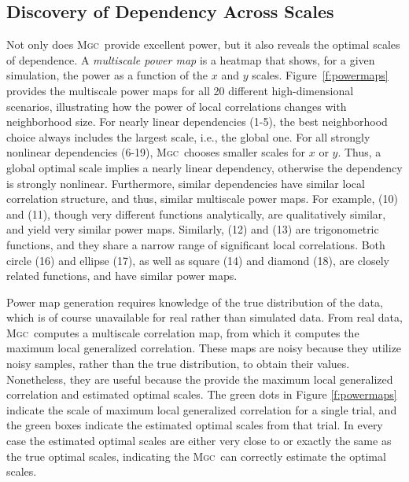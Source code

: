 \documentclass[11pt]{article}
\providecommand{\sct}[1]{{\normalfont\textsc{#1}}}
\newcommand{\Mgc}{\sct{Mgc}}
\begin{document}
\subsection*{Discovery of Dependency Across Scales}
\label{main3}

Not only does \Mgc~provide excellent power, but it also reveals the optimal scales of dependence. 
A \emph{multiscale power map} is a heatmap that shows, for a given simulation, the power as a function of the $x$ and $y$ scales.  
Figure~\ref{f:powermaps} provides the multiscale power maps for all 20 different high-dimensional scenarios, illustrating how the power of local correlations changes with  neighborhood size.
For nearly linear dependencies (1-5), the best neighborhood choice always includes the largest scale, i.e., the global one. For all strongly nonlinear dependencies (6-19),  \Mgc~chooses smaller scales for $x$ or $y$. Thus, a global optimal scale implies a nearly linear dependency, otherwise the dependency is strongly nonlinear.
Furthermore, similar dependencies have similar local correlation structure, and thus, similar multiscale power maps. For example, (10) and (11), though very different functions analytically, are qualitatively similar, and yield very similar power maps.
Similarly,  (12) and (13) are trigonometric functions, and they share a narrow range of significant local correlations.
Both circle (16) and ellipse (17), as well as square (14) and diamond (18), are closely related functions, and have similar  power maps. 

Power map generation requires knowledge of the true distribution of the data, which is of course unavailable for real rather than simulated data.
From real data, \Mgc~computes a multiscale correlation map, from which it computes the maximum local generalized correlation.  These maps are noisy because they utilize noisy samples, rather than the true distribution, to obtain their values.  Nonetheless, they are useful because the provide the maximum local generalized correlation and estimated optimal scales.  The green dots in Figure \ref{f:powermaps} indicate the scale of maximum local generalized correlation for a single trial, and the green boxes indicate the estimated optimal scales from that trial.  In every case the estimated optimal scales are either very close to or exactly the same as the true optimal scales, indicating the \Mgc~can correctly estimate the optimal scales.  


\end{document}
